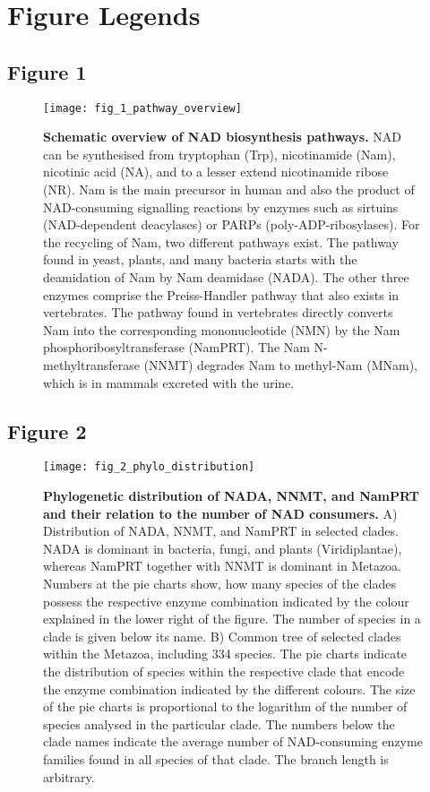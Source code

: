 
\newpage

\section*{Figure Legends}

\subsection*{Figure 1}

\begin{figure}[ht]
  \centering
  \texttt{[image: fig\_1\_pathway\_overview]}
  \caption{\textbf{Schematic overview of NAD biosynthesis pathways.} NAD can be synthesised from tryptophan (Trp), nicotinamide (Nam), nicotinic acid (NA), and to a lesser extend nicotinamide ribose (NR). Nam is the main precursor in human and also the product of NAD-consuming signalling reactions by enzymes such as sirtuins (NAD-dependent deacylases) or PARPs (poly-ADP-ribosylases). For the recycling of Nam, two different pathways exist. The pathway found in yeast, plants, and many bacteria starts with the deamidation of Nam by Nam deamidase (NADA). The other three enzymes comprise the Preiss-Handler pathway that also exists in vertebrates. The pathway found in vertebrates directly converts Nam into the corresponding mononucleotide (NMN) by the Nam phosphoribosyltransferase (NamPRT). The Nam N-methyltransferase (NNMT) degrades Nam to methyl-Nam (MNam), which is in mammals excreted with the urine.}
  \label{fig:pathway_overview}
\end{figure}

\newpage


\subsection*{Figure 2}

\begin{figure}[ht]
  \centering
  \texttt{[image: fig\_2\_phylo\_distribution]}
  \caption{\textbf{Phylogenetic distribution of NADA, NNMT, and NamPRT and their relation to the number of NAD consumers.} A) Distribution of NADA, NNMT, and NamPRT in selected clades. NADA is dominant in bacteria, fungi, and plants (Viridiplantae), whereas NamPRT together with NNMT is dominant in Metazoa. Numbers at the pie charts show, how many species of the clades possess the respective enzyme combination indicated by the colour explained in the lower right of the figure. The number of species in a clade is given below its name. B) Common tree of selected clades within the Metazoa, including 334 species. The pie charts indicate the distribution of species within the respective clade that encode the enzyme combination indicated by the different colours. The size of the pie charts is proportional to the logarithm of the number of species analysed in the particular clade. The numbers below the clade names indicate the average number of NAD-consuming enzyme families found in all species of that clade. The branch length is arbitrary.}
  \label{fig:phylo_distribution}
\end{figure}

